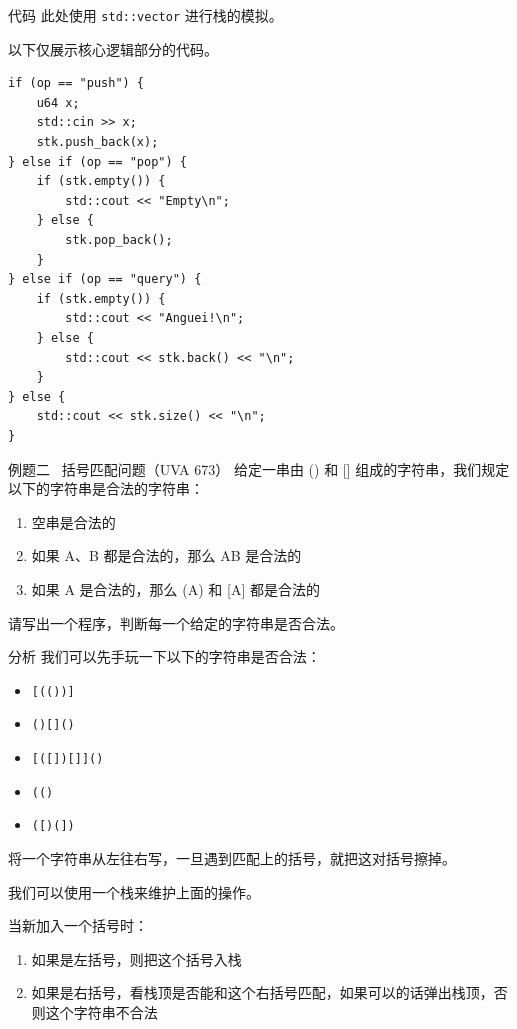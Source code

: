 \documentclass{beamer}
\begin{document}
\begin{frame}[fragile]{代码}
    此处使用 \texttt{std::vector} 进行栈的模拟。

    以下仅展示核心逻辑部分的代码。

    \begin{verbatim}
if (op == "push") {
    u64 x;
    std::cin >> x;
    stk.push_back(x);
} else if (op == "pop") {
    if (stk.empty()) {
        std::cout << "Empty\n";
    } else {
        stk.pop_back();
    }
} else if (op == "query") {
    if (stk.empty()) {
        std::cout << "Anguei!\n";
    } else {
        std::cout << stk.back() << "\n";
    }
} else {
    std::cout << stk.size() << "\n";
}
    \end{verbatim}
\end{frame}

\begin{frame}{例题二 \ 括号匹配问题（UVA 673）}
    给定一串由 () 和 [] 组成的字符串，我们规定以下的字符串是合法的字符串：
    \begin{enumerate}
        \item 空串是合法的
        \item 如果 A、B 都是合法的，那么 AB 是合法的
        \item 如果 A 是合法的，那么 (A) 和 [A] 都是合法的
    \end{enumerate}
    请写出一个程序，判断每一个给定的字符串是否合法。
\end{frame}

\begin{frame}{分析}
    我们可以先手玩一下以下的字符串是否合法：

    \begin{itemize}
        \item \texttt{[(())]}
        \item \texttt{()[]()}
        \item \texttt{[([])[]]()}
        \item \texttt{(()}
        \item \texttt{([)(])}
    \end{itemize}

    将一个字符串从左往右写，一旦遇到匹配上的括号，就把这对括号擦掉。
\end{frame}

\begin{frame}
    我们可以使用一个栈来维护上面的操作。

    当新加入一个括号时：

    \begin{enumerate}
        \item 如果是左括号，则把这个括号入栈
        \item 如果是右括号，看栈顶是否能和这个右括号匹配，如果可以的话弹出栈顶，否则这个字符串不合法
    \end{enumerate}
\end{frame}
\end{document}
